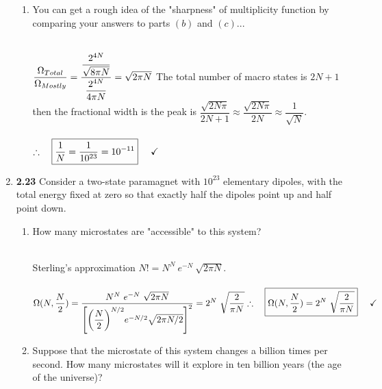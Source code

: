 \documentclass[fleqn]{article}
\begin{document}
\begin{enumerate}
\begin{enumerate}
      \item You can get a rough idea of the "sharpness" of multiplicity function by comparing your answers to parts $(b)$
      and $(c)$...

        \textcolor{hwColor}{
          \\
          $
            \dfrac{\Omega_{Total}}{\Omega_{Mostly}}
            =\dfrac{
              \dfrac{2^{4N}}{\sqrt{8 \pi N}}
            }{
              \dfrac{2^{4N}}{4 \pi N}
            }=\sqrt{2 \pi N}
            \\
            \\
          $
          The total number of macro states is $2N+1$ then the fractional width is the peak is 
          $\dfrac{\sqrt{2N\pi}}{2N+1} \approx \dfrac{\sqrt{2N\pi}}{2N} \approx \dfrac{1}{\sqrt{N}}$.
          \\
          \\
          $
            \therefore ~~~ \boxed{
              \dfrac{1}{N}=\dfrac{1}{10^{23}}=10^{-11}
            } ~~~~ \checkmark
            \\
            \\
          $
        }

    \end{enumerate}

    \item \textbf{2.23} Consider a two-state paramagnet with $10^{23}$ elementary dipoles, with the total energy fixed 
    at zero so that exactly half the dipoles point up and half point down.
    \begin{enumerate}
      \item How many microstates are "accessible" to this system?

        \textcolor{hwColor}{
          \\
          Sterling's approximation $N!=N^N ~ e^{-N} ~ \sqrt{2\pi N}$. 
          \\
          \\
          $
            \Omega(N, \dfrac{N}{2})=\dfrac{
              N^N ~ e^{-N} ~ \sqrt{2\pi N}
            }{
              \left[\bigg( \dfrac{N}{2} \bigg)^{N/2}  e^{-N/2}  \sqrt{2 \pi N/2 } \right]^2
            }=2^N ~ \sqrt{\dfrac{2}{\pi N}}
            \\
            \\
            \\
            \therefore ~~~ \boxed{
              \Omega(N, \dfrac{N}{2})=2^N ~ \sqrt{\dfrac{2}{\pi N}}
            } ~~~~ \checkmark
            \\
          $
        }
      \item Suppose that the microstate of this system changes a billion times per second. How many microstates will it
      explore in ten billion years (the age of the universe)?


\end{enumerate}
\end{enumerate}
\end{document}
